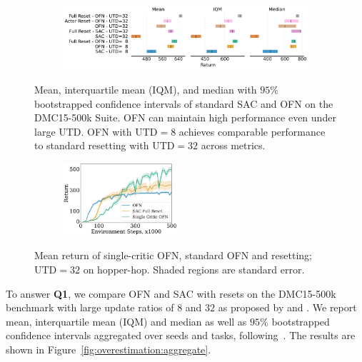 \begin{figure}[t]
\begin{minipage}[b]{0.67\textwidth}
\centering
    \begin{subfigure}[b]{\textwidth}
        \centering
        \includegraphics[width=10.2cm]{figures/dissecting/main_exp/all_aggregate_scores.pdf}
    \end{subfigure}%
    \caption{Mean, interquartile mean (IQM), and median with $95\%$ bootstrapped confidence intervals of standard SAC and OFN on the DMC15-500k Suite. OFN can maintain high performance even under large UTD. OFN with $\mathrm{UTD} = 8$ achieves comparable performance to standard resetting with $\mathrm{UTD} = 32$ across metrics.}
    \label{fig:overestimation:aggregate}
\end{minipage}
\hfill
\begin{minipage}[b]{.3\textwidth}
\centering
    \begin{subfigure}[b]{\textwidth}
        \centering
        \includegraphics[width=4.25cm]{figures/dissecting/main_exp/hopper_hop_wl.pdf}
    \end{subfigure}%
    \caption{Mean return of single-critic OFN, standard OFN and resetting; $\mathrm{UTD}=32$ on hopper-hop. Shaded regions are standard error.}
    \label{fig:overestimation:hopper_hop}
\end{minipage}
\end{figure}



To answer \textbf{Q1}, we compare OFN and SAC with resets on the DMC15-500k benchmark with large update ratios of $8$ and $32$ as proposed by \textcite{nikishin2022primacy} and  \textcite{schwarzer2023bigger}.  We report mean, interquartile mean (IQM) and median as well as $95\%$ bootstrapped confidence intervals aggregated over seeds and tasks,  following~\textcite{agarwal2021deep}. The results are shown in Figure~\ref{fig:overestimation:aggregate}.

